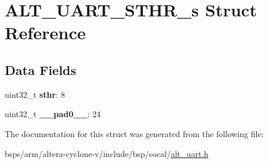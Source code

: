 \hypertarget{structALT__UART__STHR__s}{}\section{A\+L\+T\+\_\+\+U\+A\+R\+T\+\_\+\+S\+T\+H\+R\+\_\+s Struct Reference}
\label{structALT__UART__STHR__s}
\subsection*{Data Fields}
\begin{DoxyCompactItemize}
\item 
\mbox{\label{structALT__UART__STHR__s_a4ee96c48f7127edc225c9a4e704b0891}} 
uint32\+\_\+t {\bfseries sthr}\+: 8
\item 
\mbox{\label{structALT__UART__STHR__s_a0ca882c07d4e044e7c55bd09ab876085}} 
uint32\+\_\+t {\bfseries \+\_\+\+\_\+pad0\+\_\+\+\_\+}\+: 24
\end{DoxyCompactItemize}


The documentation for this struct was generated from the following file\+:\begin{DoxyCompactItemize}
\item 
bsps/arm/altera-\/cyclone-\/v/include/bsp/socal/\mbox{\hyperlink{alt__uart_8h}{alt\+\_\+uart.\+h}}\end{DoxyCompactItemize}
